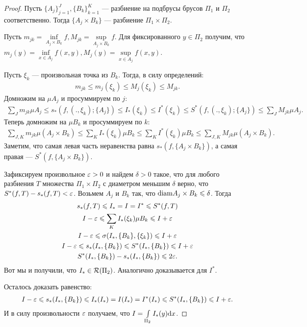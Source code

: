 \begin{proof}

Пусть $\{ A_j \}_{j=1}^{J}, \{ B_k \}_{k=1}^K$ --- разбиение на подбрусы брусов $\Pi_1$ и $\Pi_2$ соответственно. Тогда $\{ A_j \times B_k\}$ --- разбиение $\Pi_1 \times \Pi_2$.

Пусть $m_{jk} = \inf\limits_{A_j \times B_k} f, M_{jk} = \sup\limits_{A_j \times B_k} f$. Для фиксированного $y \in \Pi_2$ получим, что $m_j(y) = \inf\limits_{x \in A_j} f(x, y), M_j(y) = \sup\limits_{x \in A_j} f(x, y)$.

Пусть $\xi_k$ --- произвольная точка из $B_k$. Тогда, в силу определений:
\begin{gather*}
m_{jk} \leq m_j(\xi_k) \leq M_j(\xi_k) \leq M_{jk}. 
\end{gather*}
Домножим на $\mu A_j$ и просуммируем по $j$:
\begin{gather*}
\sum_J m_{jk} \mu A_j \leq s_*(f, (., \xi_k); \{A_j \}) \leq I_*(\xi_k) \leq I^*(\xi_k) \leq S^*(f, (., \xi_k); \{A_j \}) \leq \sum_J M_{jk} \mu A_j.
\end{gather*}
Теперь домножим на $\mu B_k$ и просуммируем по $k$:
\begin{gather*}
\sum_{J, K} m_{jk} \mu(A_j \times B_k) \leq \sum_K I_*(\xi_k)\mu B_k \leq \sum_K I^*(\xi_k) \mu B_k \leq \sum_{J, K} M_{jk} \mu(A_j \times B_k).
\end{gather*}
Заметим, что самая левая часть неравенства равна $s_*(f, \{A_j \times B_k \})$, а самая правая --- $S^*(f, \{A_j \times B_k \})$.

Зафиксируем произвольное $\varepsilon > 0$ и найдем $\delta > 0$ такое, что для любого разбиения $T$ множества $\Pi_1 \times \Pi_2$ с диаметром меньшим $\delta$ верно, что $S^*(f, T) - s_*(f, T) < \varepsilon$. Возьмем $A_j$ и $B_k$ так, что $\mathrm{diam} A_j \times B_k \leqslant \delta$. Тогда
\begin{gather*}
s_*(f, T) \leqslant I_* = I = I^* \leqslant S^*(f, T) \\
I - \varepsilon \leqslant \sum_K I_*(\xi_k) \mu B_k \leqslant I+\varepsilon \\
I - \varepsilon \leqslant \sigma(I_*, \{ B_k \}, \{\xi_k \}) \leqslant I+\varepsilon \\
I - \varepsilon \leqslant s_*(I_*, \{B_k\}) \leqslant S^*(I_*, \{B_k\}) \leqslant I +\varepsilon \\
S^*(I_*, \{B_k\}) - s_*(I_*, \{B_k\}) \leqslant 2\varepsilon.
\end{gather*}
Вот мы и получили, что $I_* \in \mathcal{R}(\Pi_2)$. Аналогично доказывается для $I^*$.

Осталось доказать равенство:
\begin{gather}
I - \varepsilon \leqslant s_*(I_*, \{B_k\}) \leqslant I_*(I_*) = I(I_*) = I^*(I_*) \leqslant  S^*(I_*, \{B_k\}) \leqslant I+\varepsilon.
\end{gather}
И в силу произвольности $\varepsilon$ получаем, что $I = \int\limits_{\Pi_2} I_*(y)\mathrm{d}x$.
\end{proof}


